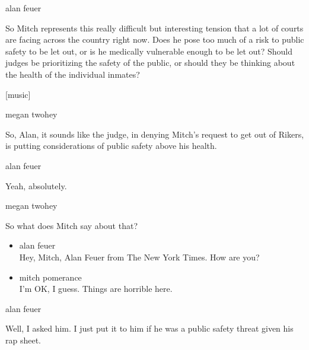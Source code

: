 alan feuer

So Mitch represents this really difficult but interesting tension that a
lot of courts are facing across the country right now. Does he pose too
much of a risk to public safety to be let out, or is he medically
vulnerable enough to be let out? Should judges be prioritizing the
safety of the public, or should they be thinking about the health of the
individual inmates?

{[}music{]}

megan twohey

So, Alan, it sounds like the judge, in denying Mitch's request to get
out of Rikers, is putting considerations of public safety above his
health.

alan feuer

Yeah, absolutely.

megan twohey

So what does Mitch say about that?

\begin{itemize}
\item
  alan feuer\\
  Hey, Mitch, Alan Feuer from The New York Times. How are you?
\item
  mitch pomerance\\
  I'm OK, I guess. Things are horrible here.
\end{itemize}

alan feuer

Well, I asked him. I just put it to him if he was a public safety threat
given his rap sheet.

